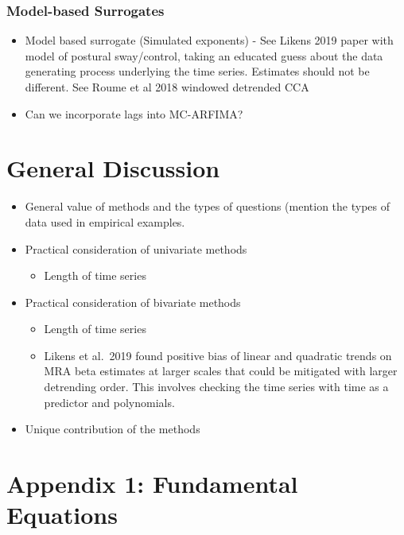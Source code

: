 \documentclass[
  man]{apa6}
\providecommand{\tightlist}{%
  \setlength{\itemsep}{0pt}\setlength{\parskip}{0pt}}
\begin{document}
\hypertarget{model-based-surrogates}{%
\subsubsection{Model-based Surrogates}\label{model-based-surrogates}}

\begin{itemize}
\tightlist
\item
  Model based surrogate (Simulated exponents) - See Likens 2019 paper
  with model of postural sway/control, taking an educated guess about
  the data generating process underlying the time series. Estimates
  should not be different. See Roume et al 2018 windowed detrended CCA
\item
  Can we incorporate lags into MC-ARFIMA?
\end{itemize}

\hypertarget{general-discussion}{%
\section{General Discussion}\label{general-discussion}}

\begin{itemize}
\item
  General value of methods and the types of questions (mention the
  types of data used in empirical examples.
\item
  Practical consideration of univariate methods

  \begin{itemize}
  \tightlist
  \item
    Length of time series
  \end{itemize}
\item
  Practical consideration of bivariate methods

  \begin{itemize}
  \item
    Length of time series
  \item
    Likens et al.~2019 found positive bias of linear and quadratic
    trends on MRA beta estimates at larger scales that could be
    mitigated with larger detrending order. This involves checking
    the time series with time as a predictor and polynomials.
  \end{itemize}
\item
  Unique contribution of the methods
\end{itemize}

\hypertarget{appendix-1-fundamental-equations}{%
\section{Appendix 1: Fundamental Equations}\label{appendix-1-fundamental-equations}}
\end{document}
